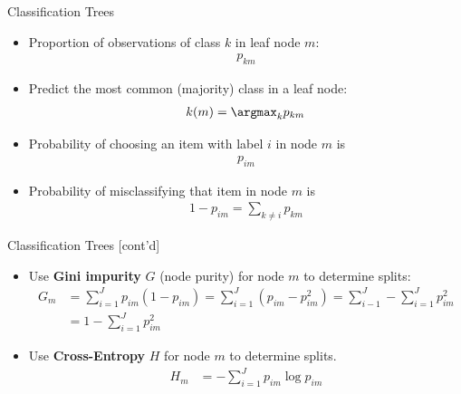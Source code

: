 \documentclass[ignorenonframetext,xcolor=x11names]{beamer}
\begin{document}
\begin{frame}{Classification Trees}
\begin{itemize}

   \item Proportion of observations of class $k$ in leaf node $m$:
   \begin{align*}p_{km}\end{align*}
   \item Predict the most common (majority) class in a leaf node: 
   \begin{align*}k(m) = \argmax_k p_{km}\end{align*}
   \item Probability of choosing an item with label $i$ in node $m$ is
   \begin{align*}p_{im}\end{align*}
   \item Probability of misclassifying that item in node $m$ is 
   \begin{align*}1 - p_{im} = \sum_{k \neq i} p_{km}\end{align*}
   
\end{itemize}
\end{frame}

\begin{frame}{Classification Trees \small [cont'd]}
\begin{itemize}
   \item Use \textbf{Gini impurity} $G$ (node purity) for node $m$ to determine splits:
   \begin{align*}
   G_m &= \sum_{i=1}^J p_{im}(1-p_{im}) = \sum_{i=1}^J (p_{im} - p_{im}^2) = \sum_{i-1}^J - \sum_{i=1}^J p_{im}^2 \\
     &= 1 - \sum_{i=1}^J p_{im}^2
   \end{align*} 
   
   \item Use \textbf{Cross-Entropy} $H$ for node $m$ to determine splits.
   \begin{align*}
   H_m &= - \sum_{i=1}^J p_{im} \log p_{im} 
   \end{align*}
   
\end{itemize}
\end{frame}
\end{document}
